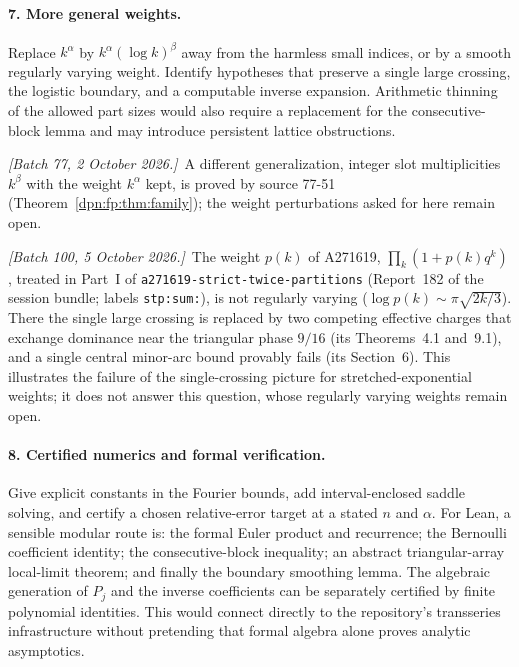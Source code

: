 \documentclass[11pt]{article}
\numberwithin{equation}{section}
\theoremstyle{definition}\newtheorem{definition}[theorem]{Definition}
\theoremstyle{remark}\newtheorem{remark}[theorem]{Remark}
\newcommand{\writenotec}[1]{\par\smallskip\noindent\textit{[Batch 77, 2 October 2026.]}\ #1\par\smallskip}
\newcommand{\writenoted}[1]{\par\smallskip\noindent\textit{[Batch 100, 5 October 2026.]}\ #1\par\smallskip}
\begin{document}
\paragraph{7. More general weights.}
Replace $k^\alpha$ by $k^\alpha(\log k)^\beta$ away from the harmless small
indices, or by a smooth regularly varying weight. Identify hypotheses that
preserve a single large crossing, the logistic boundary, and a computable
inverse expansion. Arithmetic thinning of the allowed part sizes would also
require a replacement for the consecutive-block lemma and may introduce
persistent lattice obstructions.
\writenotec{A different generalization, integer slot multiplicities
$k^\beta$ with the weight $k^\alpha$ kept, is proved by source 77-51
(Theorem~\ref{dpn:fp:thm:family}); the weight perturbations asked for here
remain open.}
\writenoted{The weight $p(k)$ of A271619, $\prod_k(1+p(k)q^k)$, treated in
Part~I of
\texttt{a271619-\allowbreak strict-\allowbreak twice-\allowbreak partitions}
(Report~182 of the session bundle; labels \texttt{stp:sum:}), is not
regularly varying ($\log p(k)\sim\pi\sqrt{2k/3}$). There the single large
crossing is replaced by two competing effective charges that exchange
dominance near the triangular phase $9/16$ (its Theorems~4.1 and~9.1), and
a single central minor-arc bound provably fails (its Section~6). This
illustrates the failure of the single-crossing picture for
stretched-exponential weights; it does not answer this question, whose
regularly varying weights remain open.}

\paragraph{8. Certified numerics and formal verification.}
Give explicit constants in the Fourier bounds, add interval-enclosed saddle
solving, and certify a chosen relative-error target at a stated $n$ and
$\alpha$. For Lean, a sensible modular route is: the formal Euler product and
recurrence; the Bernoulli coefficient identity; the consecutive-block
inequality; an abstract triangular-array local-limit theorem; and finally the
boundary smoothing lemma. The algebraic generation of $P_j$ and the inverse
coefficients can be separately certified by finite polynomial identities.
This would connect directly to the repository's transseries infrastructure
without pretending that formal algebra alone proves analytic asymptotics.
\end{document}
